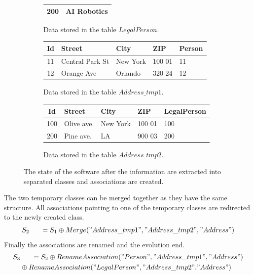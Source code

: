 \documentclass[11pt]{article}
\begin{document}
\begin{figure}
\begin{subfigure}[b]{0.5\textwidth}
\begin{tabular}{| c | l |}
		200 & AI Robotics \\ \hline
	\end{tabular}
	\caption{Data stored in the table $LegalPerson$.}
\end{subfigure}
\begin{subfigure}[b]{\textwidth}
	\centering
	\begin{tabular}{| c | l | l | l | l |}
	 	\hline
		Id & Street & City & ZIP & Person \\ \hline  
		11 & Central Park St & New York & 100 01 & 11  \\ \hline
		12 & Orange Ave & Orlando & 320 24 & 12 \\ \hline
	\end{tabular}
	\caption{Data stored in the table $Address\_tmp1$.}
\end{subfigure}
\begin{subfigure}[b]{\textwidth}
	\centering
	\begin{tabular}{| c | l | l | l | l |}
	 	\hline
		Id & Street & City & ZIP & LegalPerson\\ \hline  
		100 & Olive ave. & New York & 100 01 & 100 \\ \hline
		200 & Pine ave. & LA & 900 03 & 200  \\ \hline
	\end{tabular}
	\caption{Data stored in the table $Address\_tmp2$.}
\end{subfigure}


	\caption{The state of the software after the information are extracted into separated classes and associations are created.}
	\label{fig:case2}
\end{figure}
The two temporary classes can be merged together as they have the same structure. All associations pointing to one of the temporary classes are redirected to the newly created class.
\begin{align*}
%
%
S_2 & \;\;\;\;\;\; =S_1 \oplus Merge("Address\_tmp1", "Address\_tmp2", "Address") \\
\end{align*}
Finally the associations are renamed and the evolution end.
\begin{align*}
S_3 & \;\;\;\;\;\; =S_2  \oplus RenameAssociation("Person", "Address\_tmp1", "Address")\\
& \oplus RenameAssociation("LegalPerson", "Address\_tmp2". "Address")\\
\end{align*}
\end{document}
